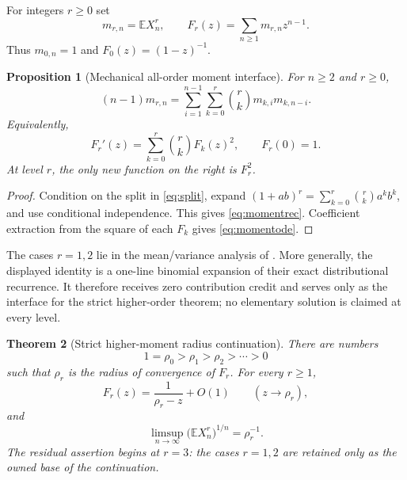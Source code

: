 \documentclass[10pt,a4paper]{amsart}
\newtheorem{theorem}{Theorem}[section]
\newtheorem{proposition}[theorem]{Proposition}
\theoremstyle{definition}
\theoremstyle{remark}
\newcommand{\E}{\mathbb E}
\begin{document}
For integers $r\geq0$ set
\[
 m_{r,n}=\E X_n^r,\qquad
 F_r(z)=\sum_{n\geq1}m_{r,n}z^{n-1}.
\]
Thus $m_{0,n}=1$ and $F_0(z)=(1-z)^{-1}$.

\begin{proposition}[Mechanical all-order moment interface]\label{prop:moments}
For $n\geq2$ and $r\geq0$,
\begin{equation}\label{eq:momentrec}
 (n-1)m_{r,n}=\sum_{i=1}^{n-1}\sum_{k=0}^r
       \binom rk m_{k,i}m_{k,n-i}.
\end{equation}
Equivalently,
\begin{equation}\label{eq:momentode}
 F_r'(z)=\sum_{k=0}^r\binom rk F_k(z)^2,
 \qquad F_r(0)=1.
\end{equation}
At level $r$, the only new function on the right is $F_r^2$.
\end{proposition}

\begin{proof}
Condition on the split in \eqref{eq:split}, expand
$(1+ab)^r=\sum_{k=0}^r\binom rk a^k b^k$, and use conditional
independence.  This gives \eqref{eq:momentrec}.  Coefficient extraction from
the square of each $F_k$ gives \eqref{eq:momentode}.
\end{proof}

The cases $r=1,2$ lie in the mean/variance analysis of
\citet{DisantoEtAl2022}.  More generally, the displayed identity is a
one-line binomial expansion of their exact distributional recurrence.  It
therefore receives zero contribution credit and serves only as the interface
for the strict higher-order theorem; no elementary solution is claimed at
every level.

\begin{theorem}[Strict higher-moment radius continuation]\label{thm:radii}
There are numbers
\begin{equation}\label{eq:rholadder}
             1=\rho_0>\rho_1>\rho_2>\cdots>0
\end{equation}
such that $\rho_r$ is the radius of convergence of $F_r$.  For every
$r\geq1$,
\begin{equation}\label{eq:localpole}
 F_r(z)=\frac1{\rho_r-z}+O(1)\qquad(z\to\rho_r),
\end{equation}
and
\begin{equation}\label{eq:limsup}
 \limsup_{n\to\infty}\bigl(\E X_n^r\bigr)^{1/n}=\rho_r^{-1}.
\end{equation}
The residual assertion begins at $r=3$: the cases $r=1,2$ are retained only
as the owned base of the continuation.
\end{theorem}
\end{document}
